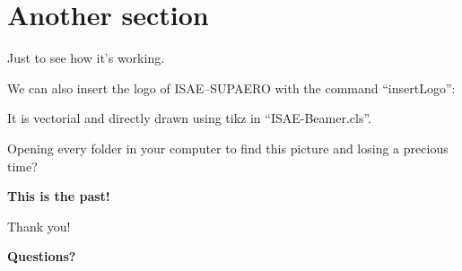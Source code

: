 \documentclass[aspectratio=169]{ISAE-Beamer}
\begin{document}
\section{Another section}
\begin{frame}

Just to see how it's working.
\vfill

We can also insert the logo of ISAE--SUPAERO with the command ``insertLogo'':

\begin{center}
\insertLogo
\end{center}
\vfill

It is vectorial and directly drawn using tikz in ``ISAE-Beamer.cls''.

Opening every folder in your computer to find this picture and losing a precious time? \begin{center}
\textbf{This is the past!}
\end{center}

\end{frame}

\begin{frame}{Thank you!}

\centering
\textbf{\Huge Questions?}

\end{frame}
\end{document}
